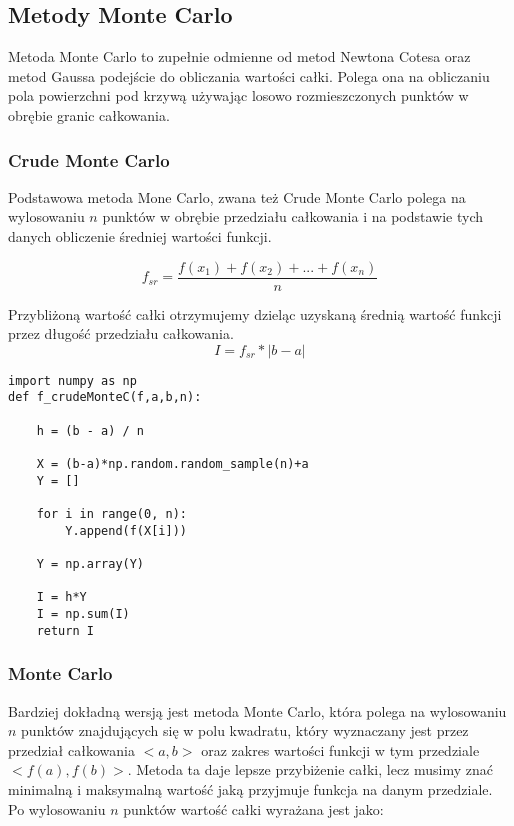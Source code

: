 \documentclass[12pt,twoside]{article}
\begin{document}
\subsection{Metody Monte Carlo}

Metoda Monte Carlo to zupełnie odmienne od metod Newtona Cotesa oraz metod Gaussa podejście do obliczania wartości całki. Polega ona na obliczaniu pola powierzchni pod krzywą używając losowo rozmieszczonych punktów w obrębie granic całkowania.\\

\subsubsection{Crude Monte Carlo}
Podstawowa metoda Mone Carlo, zwana też Crude Monte Carlo polega  na wylosowaniu $n$ punktów w obrębie przedziału całkowania i na podstawie tych danych obliczenie średniej wartości funkcji. \cite{MonteCarlo_1}

\begin{equation}
f_{sr} = \frac{f(x_1)+f(x_2) + ... + f(x_n)}{n}
\label{Eq:MonteCarlo1}
\end{equation}

Przybliżoną wartość całki otrzymujemy dzieląc uzyskaną średnią wartość funkcji przez długość przedziału całkowania.
\begin{equation}
 I = f_{sr} * |b-a| 
\label{Eq:MonteCarlo2}
\end{equation}

\begin{lstlisting}[caption={Kod w języku python implementujący metodę Crude Monte Carlo}]
	import numpy as np
def f_crudeMonteC(f,a,b,n):

    h = (b - a) / n

    X = (b-a)*np.random.random_sample(n)+a
    Y = []

    for i in range(0, n):
        Y.append(f(X[i]))

    Y = np.array(Y)

    I = h*Y
    I = np.sum(I)
    return I

\end{lstlisting}
\label{Listing 6}

\subsubsection{Monte Carlo}
Bardziej dokładną wersją jest metoda Monte Carlo, która polega na wylosowaniu $n$ punktów znajdujących się w polu kwadratu, który wyznaczany jest przez przedział całkowania $<a,b>$ oraz zakres wartości funkcji w tym przedziale $<f(a),f(b)>$.
Metoda ta daje lepsze przybiżenie całki, lecz musimy znać minimalną i maksymalną wartość jaką przyjmuje funkcja na danym przedziale. Po wylosowaniu $n$ punktów wartość całki wyrażana jest jako:
\end{document}

